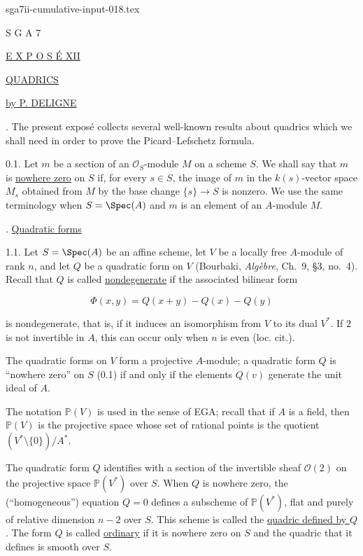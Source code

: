\begin{filecontents*}{sga7ii-cumulative-input-018.tex}
\clearpage
\begin{center}
S G A 7

\bigskip
\underline{E X P O S É XII}

\bigskip
\underline{QUADRICS}

\bigskip
\underline{by P. DELIGNE}
\end{center}

. The present exposé collects several well-known results about
quadrics which we shall need in order to prove the Picard--Lefschetz
formula.

0.1. Let $m$ be a section of an $\mathcal O_S$-module $M$ on a scheme
$S$.  We shall say that $m$ is \underline{nowhere zero} on $S$ if, for
every $s\in S$, the image of $m$ in the $k(s)$-vector space $M_s$ obtained
from $M$ by the base change $\{s\}\longrightarrow S$ is nonzero.  We use
the same terminology when $S=\Spec(A)$ and $m$ is an element of an
$A$-module $M$.

. \underline{Quadratic forms}

1.1. Let $S=\Spec(A)$ be an affine scheme, let $V$ be a locally free
$A$-module of rank $n$, and let $Q$ be a quadratic form on $V$
(Bourbaki, \emph{Algèbre}, Ch.~9, \S3, no.~4).  Recall that $Q$ is called
\underline{nondegenerate} if the associated bilinear form

\begin{equation*}
\Phi(x,y)=Q(x+y)-Q(x)-Q(y)
\end{equation*}

is nondegenerate, that is, if it induces an isomorphism from $V$ to its
dual $V^*$.  If $2$ is not invertible in $A$, this can occur only when
$n$ is even (loc. cit.).


The quadratic forms on $V$ form a projective $A$-module; a quadratic form
$Q$ is ``nowhere zero'' on $S$ (0.1) if and only if the elements $Q(v)$
generate the unit ideal of $A$.

The notation $\mathbb P(V)$ is used in the sense of EGA; recall that if
$A$ is a field, then $\mathbb P(V)$ is the projective space whose set of
rational points is the quotient $(V^*\setminus\{0\})/A^*$.

The quadratic form $Q$ identifies with a section of the invertible sheaf
$\mathcal O(2)$ on the projective space $\mathbb P(V^*)$ over $S$.  When
$Q$ is nowhere zero, the (``homogeneous'') equation $Q=0$ defines a
subscheme of $\mathbb P(V^*)$, flat and purely of relative dimension
$n-2$ over $S$.  This scheme is called the \underline{quadric defined by
$Q$}.  The form $Q$ is called \underline{ordinary} if it is nowhere zero
on $S$ and the quadric that it defines is smooth over $S$.


\end{filecontents*}
